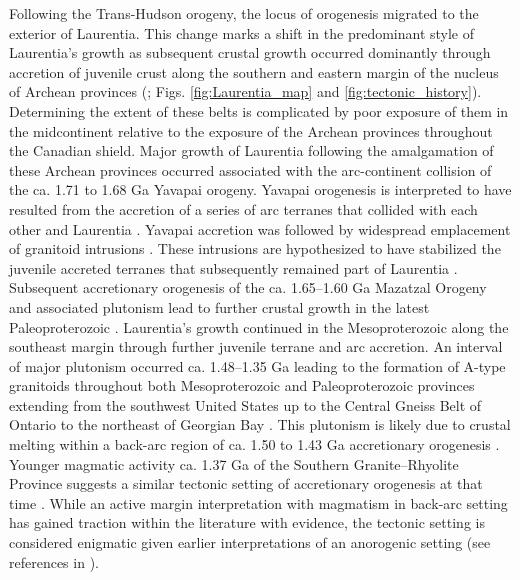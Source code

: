 \documentclass[11pt,letterpaper]{article}
\begin{document}
Following the Trans-Hudson orogeny, the locus of orogenesis migrated to the exterior of Laurentia. This change marks a shift in the predominant style of Laurentia's growth as subsequent crustal growth occurred dominantly through accretion of juvenile crust along the southern and eastern margin of the nucleus of Archean provinces (\citealp{Whitmeyer2007a}; Figs. \ref{fig:Laurentia_map} and \ref{fig:tectonic_history}). Determining the extent of these belts is complicated by poor exposure of them in the midcontinent relative to the exposure of the Archean provinces throughout the Canadian shield. Major growth of Laurentia following the amalgamation of these Archean provinces occurred associated with the arc-continent collision of the ca. 1.71 to 1.68 Ga Yavapai orogeny. Yavapai orogenesis is interpreted to have resulted from the accretion of a series of arc terranes that collided with each other and Laurentia \citep{Whitmeyer2007a}. Yavapai accretion was followed by widespread emplacement of granitoid intrusions \citep{Whitmeyer2007a}. These intrusions are hypothesized to have stabilized the juvenile accreted terranes that subsequently remained part of Laurentia \citep{Whitmeyer2007a}. Subsequent accretionary orogenesis of the ca. 1.65–1.60 Ga Mazatzal Orogeny and associated plutonism lead to further crustal growth in the latest Paleoproterozoic \citep{Whitmeyer2007a}. Laurentia's growth continued in the Mesoproterozoic along the southeast margin through further juvenile terrane and arc accretion. An interval of major plutonism occurred ca. 1.48–1.35 Ga leading to the formation of A-type granitoids throughout both Mesoproterozoic and Paleoproterozoic provinces extending from the southwest United States up to the Central Gneiss Belt of Ontario to the northeast of Georgian Bay \citep{Slagstad2009a}. This plutonism is likely due to crustal melting within a back-arc region of ca. 1.50 to 1.43 Ga accretionary orogenesis \citep{Bickford2015a}. Younger magmatic activity ca. 1.37 Ga  of the Southern Granite–Rhyolite Province suggests a similar tectonic setting of accretionary orogenesis at that time \citep{Bickford2015a}. While an active margin interpretation with magmatism in back‐arc setting has gained traction within the literature with evidence, the tectonic setting is considered enigmatic given earlier interpretations of an anorogenic setting (see references in \citealp{Slagstad2009a}). 
\end{document}
